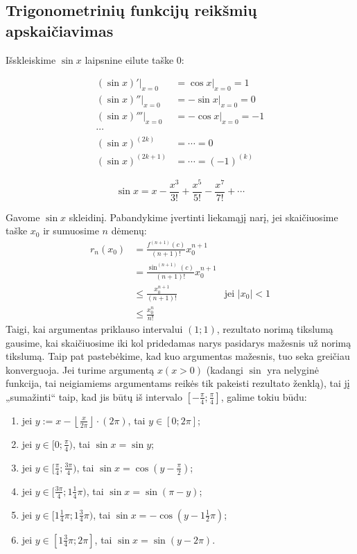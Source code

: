 \subsection{Trigonometrinių funkcijų reikšmių apskaičiavimas}

Išskleiskime $\sin x$ laipsnine eilute taške $0$:

\begin{align*}
  (\sin x)'|_{x=0} &= \cos x|_{x=0} = 1 \\
  (\sin x)''|_{x=0} &= -\sin x|_{x=0} = 0 \\
  (\sin x)''' |_{x=0} &= -\cos x|_{x=0} = -1 \\
  \cdots \\
  (\sin x)^{(2k)} &= \cdots = 0 \\
  (\sin x)^{(2k+1)} &= \cdots = (-1)^{(k)}
\end{align*}

\begin{equation}
  \sin x = x - \frac{x^3}{3!} + \frac{x^5}{5!} - \frac{x^7}{7!} + \cdots
  \label{sin_1}
\end{equation}

Gavome $\sin x$ skleidinį. Pabandykime įvertinti liekamąjį narį, jei
skaičiuosime taške $x_{0}$ ir sumuosime $n$ dėmenų:
\begin{align}
  r_{n}(x_{0}) %
  &= \frac{f^{(n+1)}(c)}{(n+1)!} x_{0}^{n+1} \\
  &= \frac{\sin^{(n+1)}(c)}{(n+1)!} x_{0}^{n+1} \\
  &\leq \frac{x_{0}^{n+1}}{(n+1)!} & \text{jei } |x_{0}| < 1 \\
  &\leq \frac{x_{0}^{n}}{n!} 
\end{align}
Taigi, kai argumentas priklauso intervalui $(1; 1)$, rezultato norimą
tikslumą gausime, kai skaičiuosime iki kol pridedamas narys pasidarys
mažesnis už norimą tikslumą. Taip pat pastebėkime, kad kuo argumentas
mažesnis, tuo seka greičiau konverguoja. Jei turime argumentą 
$x (x > 0)$ (kadangi $\sin$ yra nelyginė funkcija, tai neigiamiems 
argumentams reikės tik pakeisti rezultato ženklą), tai jį „sumažinti“ 
taip, kad jis būtų iš intervalo $[-\frac{\pi}{4}; \frac{\pi}{4}]$, galime 
tokiu būdu:
\begin{enumerate}
  \item jei 
    $y := x - \left\lfloor \frac{x}{2\pi} \right\rfloor \cdot (2\pi)$, 
    tai $y \in [0; 2\pi]$;
  \item jei $y \in [0; \frac{\pi}{4})$, tai $\sin x = \sin y$;
  \item jei $y \in [\frac{\pi}{4}; \frac{3\pi}{4})$, tai 
    $\sin x = \cos (y - \frac{\pi}{2})$;
  \item jei $y \in [\frac{3\pi}{4}; 1\frac{1}{4}\pi)$, tai 
    $\sin x = \sin (\pi - y)$;
  \item jei $y \in [1\frac{1}{4}\pi; 1\frac{3}{4}\pi)$, tai
    $\sin x = -\cos (y - 1\frac{1}{2}\pi)$;
  \item jei $y \in [1\frac{3}{4}\pi; 2\pi]$, tai
    $\sin x = \sin (y - 2\pi)$.
\end{enumerate}

